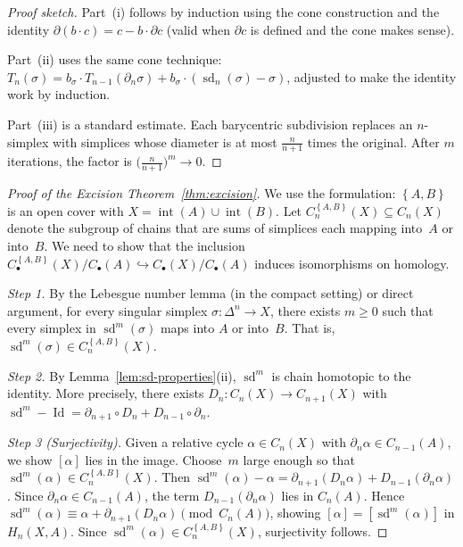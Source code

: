\documentclass[12pt,a4paper,openany]{book}
\theoremstyle{definition}
\theoremstyle{plain}
\theoremstyle{remark}
\DeclareMathOperator{\Id}{Id}
\newcommand{\set}[1]{\left\{#1\right\}}
\begin{document}
\begin{proof}[Proof sketch]
Part~(i) follows by induction using the cone construction and the
identity $\partial(b\cdot c)=c-b\cdot\partial c$ (valid when $\partial c$
is defined and the cone makes sense).

Part~(ii) uses the same cone technique: $T_n(\sigma)=b_\sigma\cdot
T_{n-1}(\partial_n\sigma)+b_\sigma\cdot(\operatorname{sd}_n(\sigma)-\sigma)$,
adjusted to make the identity work by induction.

Part~(iii) is a standard estimate.  Each barycentric subdivision replaces
an $n$-simplex with simplices whose diameter is at most
$\frac{n}{n+1}$ times the original.  After $m$ iterations, the factor
is $\bigl(\frac{n}{n+1}\bigr)^m\to 0$.
\end{proof}

\begin{proof}[Proof of the Excision Theorem~\ref{thm:excision}]
We use the formulation: $\set{A,B}$ is an open cover with
$X=\operatorname{int}(A)\cup\operatorname{int}(B)$.  Let
$C_n^{\set{A,B}}(X)\subseteq C_n(X)$ denote the subgroup of chains that
are sums of simplices each mapping into~$A$ or into~$B$.  We need to
show that the inclusion
$C_\bullet^{\set{A,B}}(X)/C_\bullet(A)\hookrightarrow C_\bullet(X)/C_\bullet(A)$
induces isomorphisms on homology.

\medskip\noindent
\textit{Step 1.}
By the Lebesgue number lemma (in the compact
setting) or direct argument, for every singular simplex
$\sigma\colon\Delta^n\to X$, there exists $m\ge 0$ such that every simplex
in $\operatorname{sd}^m(\sigma)$ maps into $A$ or into~$B$.  That is,
$\operatorname{sd}^m(\sigma)\in C_n^{\set{A,B}}(X)$.

\medskip\noindent
\textit{Step 2.}
By Lemma~\ref{lem:sd-properties}(ii), $\operatorname{sd}^m$ is chain homotopic
to the identity.  More precisely, there exists $D_n\colon C_n(X)\to C_{n+1}(X)$
with $\operatorname{sd}^m-\Id=\partial_{n+1}\circ D_n+D_{n-1}\circ\partial_n$.

\medskip\noindent
\textit{Step 3 (Surjectivity).}
Given a relative cycle $\alpha\in C_n(X)$ with
$\partial_n\alpha\in C_{n-1}(A)$, we show $[\alpha]$ lies in the image.
Choose~$m$ large enough so that $\operatorname{sd}^m(\alpha)\in
C_n^{\set{A,B}}(X)$.  Then
$\operatorname{sd}^m(\alpha)-\alpha=\partial_{n+1}(D_n\alpha)+D_{n-1}(\partial_n\alpha)$.
Since $\partial_n\alpha\in C_{n-1}(A)$, the term $D_{n-1}(\partial_n\alpha)$
lies in $C_n(A)$.  Hence $\operatorname{sd}^m(\alpha)\equiv\alpha+\partial_{n+1}(D_n\alpha)
\pmod{C_n(A)}$, showing $[\alpha]=[\operatorname{sd}^m(\alpha)]$
in $H_n(X,A)$.  Since $\operatorname{sd}^m(\alpha)\in C_n^{\set{A,B}}(X)$,
surjectivity follows.


\end{proof}
\end{document}
